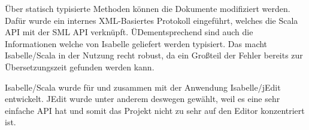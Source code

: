 Über statisch typisierte Methoden können die Dokumente modifiziert werden. Dafür wurde ein internes
XML-Basiertes Protokoll eingeführt, welches die Scala API mit der SML API verknüpft.
ÜDementsprechend sind auch die Informationen welche von Isabelle geliefert werden typisiert. Das
macht Isabelle/Scala in der Nutzung recht robust, da ein Großteil der Fehler bereits zur
Übersetzungszeit gefunden werden kann.

Isabelle/Scala wurde für und zusammen mit der Anwendung Isabelle/jEdit entwickelt. JEdit wurde unter
anderem deswegen gewählt, weil es eine sehr einfache API hat und somit das Projekt nicht zu sehr auf
den Editor konzentriert ist.

